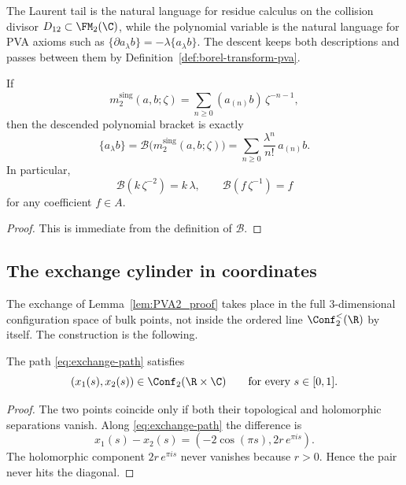 \begin{remark}
The Laurent tail is the natural language for residue calculus on the collision divisor
$D_{12}\subset\FM_2(\C)$, while the polynomial variable is the natural language for
PVA axioms such as
$\{\partial a_\lambda b\}=-\lambda\{a_\lambda b\}$. The descent keeps both
descriptions and passes between them by Definition~\ref{def:borel-transform-pva}.
\end{remark}

\begin{lemma}
\label{lem:two-point-dictionary}
If
\[
m_2^{\mathrm{sing}}(a,b;\zeta)=\sum_{n\ge0}(a_{(n)}b)\,\zeta^{-n-1},
\]
then the descended polynomial bracket is exactly
\[
\{a_\lambda b\}=\mathcal B\bigl(m_2^{\mathrm{sing}}(a,b;\zeta)\bigr)
=
\sum_{n\ge0}\frac{\lambda^n}{n!}\,a_{(n)}b.
\]
In particular,
\[
\mathcal B(k\,\zeta^{-2})=k\,\lambda,
\qquad
\mathcal B(f\,\zeta^{-1})=f
\]
for any coefficient $f\in A$.
\end{lemma}

\begin{proof}
This is immediate from the definition of $\mathcal B$.
\end{proof}

\subsection{The exchange cylinder in coordinates}

The exchange of Lemma~\ref{lem:PVA2_proof} takes place in the
full $3$-dimensional configuration space of bulk points, not inside the ordered line
$\Conf_2^{<}(\R)$ by itself. The construction is the following.

\begin{proposition}
\label{prop:exchange-path-avoids-diagonal}
The path \eqref{eq:exchange-path} satisfies
\[
(x_1(s),x_2(s))\in \Conf_2(\R\times\C)\qquad\text{for every }s\in[0,1].
\]
\end{proposition}

\begin{proof}
The two points coincide only if both their topological and holomorphic separations vanish.
Along \eqref{eq:exchange-path} the difference is
\[
x_1(s)-x_2(s)=(-2\cos(\pi s),2r\,e^{\pi i s}).
\]
The holomorphic component $2r\,e^{\pi i s}$ never vanishes because $r>0$.
Hence the pair never hits the diagonal.
\end{proof}

